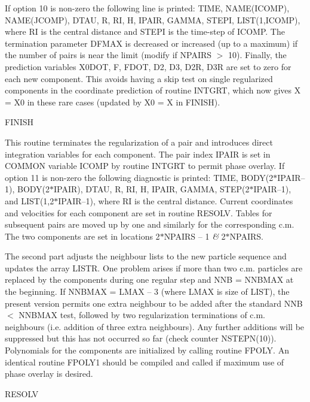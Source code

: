 If option 10 is non-zero the following line is printed: TIME,
 NAME(ICOMP), NAME(JCOMP), DTAU, R, RI, H, IPAIR, GAMMA, STEPI,
 LIST(1,ICOMP), where RI is the central distance and STEPI is the time-step of
 ICOMP.  The termination parameter DFMAX is
 decreased or increased (up to a maximum) if the number of
 pairs is near the limit (modify if NPAIRS $>$ 10).  Finally, the prediction  
 variables X0DOT, F, FDOT, D2, D3, D2R, D3R are set to zero for
 each new component.  This avoids having a skip test on single
 regularized components in the coordinate prediction of routine INTGRT, which now
 gives X = X0 in these rare cases (updated by X0 = X in FINISH).
\bigskip
\bigskip
\centerline {FINISH}
\bigskip

 This routine terminates the regularization of a pair and introduces direct
 integration variables for each component.  The pair index IPAIR is set in
 COMMON variable ICOMP by routine INTGRT to permit phase overlay.  If option 11
 is non-zero the following diagnostic is printed: TIME, BODY(2$\ast$IPAIR--1),
 BODY(2$\ast$IPAIR), DTAU, R, RI, H, IPAIR, GAMMA, STEP(2$\ast$IPAIR--1), and
 LIST(1,2$\ast$IPAIR--1), where RI is the central distance.  Current
 coordinates and velocities for each component are set in routine
 RESOLV.  Tables for subsequent pairs are moved up by one and
 similarly for the corresponding c.m.  The two components are set in
 locations 2$\ast$NPAIRS -- 1 {\it\&} 2$\ast$NPAIRS.

 The second part adjusts the neighbour lists to the new particle sequence and
 updates the array LISTR.  One problem arises if more than two c.m.
 particles are replaced by the components during one regular step and
 NNB = NNBMAX at the beginning.  If NNBMAX = LMAX -- 3 (where
 LMAX is size of LIST), the present version permits one extra
 neighbour to be added after the standard NNB $<$ NNBMAX test, followed
 by two regularization terminations of c.m. neighbours (i.e. addition
 of three extra neighbours).  Any further additions will be suppressed
 but this has not occurred so far (check counter 
 NSTEPN(10)).  Polynomials for the components are initialized by calling
 routine FPOLY.  An identical routine FPOLY1 should be compiled 
 and called if maximum use of phase overlay is desired.
\bigskip
\bigskip
\centerline {RESOLV}
\bigskip

